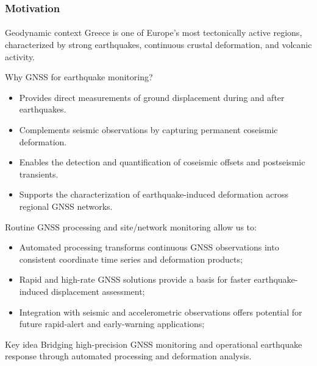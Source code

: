 \begin{frame}\frametitle{Motivation}\framesubtitle{}
\vskip-0.7cm
\begin{block}{Geodynamic context}
Greece is one of Europe's most tectonically active regions, characterized 
by strong earthquakes, continuous crustal deformation, and volcanic activity.
\end{block}

Why GNSS for earthquake monitoring?
\begin{itemize}\setlength\itemsep{.1em}
  \item Provides direct measurements of ground displacement during and after earthquakes.
  \item Complements seismic observations by capturing permanent coseismic deformation.
  \item Enables the detection and quantification of coseismic offsets and postseismic transients.
  \item Supports the characterization of earthquake-induced deformation across regional GNSS networks.
\end{itemize}


Routine GNSS processing and site/network monitoring allow us to:
\begin{itemize}
  \item Automated processing transforms continuous GNSS observations 
        into consistent coordinate time series and deformation products;
  \item Rapid and high-rate GNSS solutions provide a basis for faster 
        earthquake-induced displacement assessment;
  \item Integration with seismic and accelerometric observations offers potential 
        for future rapid-alert and early-warning applications;
\end{itemize}

\vfill

\begin{alertblock}{Key idea}
Bridging high-precision GNSS monitoring and operational earthquake response 
through automated processing and deformation analysis.
\end{alertblock}

\end{frame}
%
